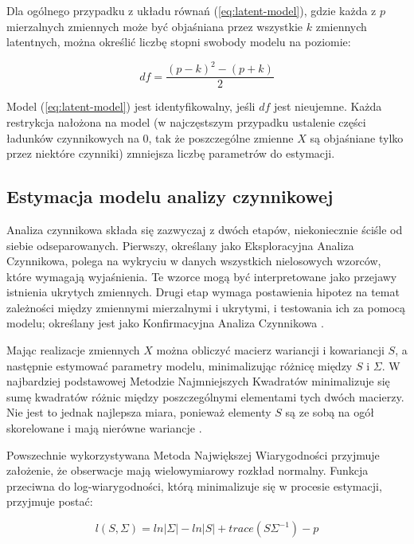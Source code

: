 \documentclass[12pt]{article}
\begin{document}
Dla ogólnego przypadku z układu równań (\ref{eq:latent-model}), gdzie każda z \(p\) mierzalnych zmiennych może być objaśniana przez wszystkie \(k\) zmiennych latentnych, można określić liczbę stopni swobody modelu na poziomie:

\begin{equation}
\label{eq:df}
df = \frac{(p-k)^2 - (p+k)}{2}
\end{equation}

Model (\ref{eq:latent-model}) jest identyfikowalny, jeśli \(df\) jest nieujemne. Każda restrykcja nałożona na model (w najczęstszym przypadku ustalenie części ładunków czynnikowych na 0, tak że poszczególne zmienne \(X\) są objaśniane tylko przez niektóre czynniki) zmniejsza liczbę parametrów do estymacji.

\hypertarget{estymacja-modelu-analizy-czynnikowej}{%
\subsection{Estymacja modelu analizy czynnikowej}\label{estymacja-modelu-analizy-czynnikowej}}

Analiza czynnikowa składa się zazwyczaj z dwóch etapów, niekoniecznie ściśle od siebie odseparowanych. Pierwszy, określany jako Eksploracyjna Analiza Czynnikowa, polega na wykryciu w danych wszystkich nielosowych wzorców, które wymagają wyjaśnienia. Te wzorce mogą być interpretowane jako przejawy istnienia ukrytych zmiennych. Drugi etap wymaga postawienia hipotez na temat zależności między zmiennymi mierzalnymi i ukrytymi, i testowania ich za pomocą modelu; określany jest jako Konfirmacyjna Analiza Czynnikowa \citep{Everitt}.

Mając realizacje zmiennych \(X\) można obliczyć macierz wariancji i kowariancji \(S\), a następnie estymować parametry modelu, minimalizując różnicę między \(S\) i \(\Sigma\). W najbardziej podstawowej Metodzie Najmniejszych Kwadratów minimalizuje się sumę kwadratów różnic między poszczególnymi elementami tych dwóch macierzy. Nie jest to jednak najlepsza miara, ponieważ elementy \(S\) są ze sobą na ogół skorelowane i mają nierówne wariancje \citep{Everitt}.

Powszechnie wykorzystywana Metoda Największej Wiarygodności przyjmuje założenie, że obserwacje mają wielowymiarowy rozkład normalny. Funkcja przeciwna do log-wiarygodności, którą minimalizuje się w procesie estymacji, przyjmuje postać:

\begin{equation}
\label{eq:loglikelihood}
l(S, \Sigma) = ln|\Sigma| - ln|S| + trace(S \Sigma^{-1}) - p
\end{equation}
\end{document}
